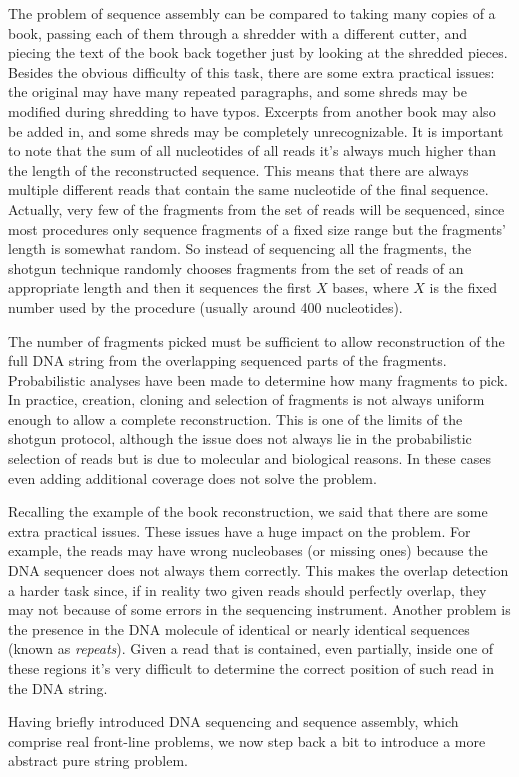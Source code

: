 \documentclass[a4paper,12pt, oneside]{article}
\begin{document}
The problem of sequence assembly can be compared to taking many copies of a book, passing each of them through a shredder with a different cutter, and piecing the text of the book back together just by looking at the shredded pieces. Besides the obvious difficulty of this task, there are some extra practical issues: the original may have many repeated paragraphs, and some shreds may be modified during shredding to have typos. Excerpts from another book may also be added in, and some shreds may be completely unrecognizable. \cite{seqassemblywiki}
It is important to note that the sum of all nucleotides of all reads it's always much higher than the length of the reconstructed sequence. This means that there are always multiple different reads that contain the same nucleotide of the final sequence. Actually, very few of the fragments from the set of reads will be sequenced, since most procedures only sequence fragments of a fixed size range but the fragments' length is somewhat random. So instead of sequencing all the fragments, the shotgun technique randomly chooses fragments from the set of reads of an appropriate length and then it sequences the first $X$ bases, where $X$ is the fixed number used by the procedure (usually around 400 nucleotides). \cite{gusfield} 
\par
The number of fragments picked must be sufficient to allow reconstruction of the full DNA string from the overlapping sequenced parts of the fragments. Probabilistic analyses have been made \cite{mathangen} to determine how many fragments to pick. In practice, creation, cloning and selection of fragments is not always uniform enough to allow a complete reconstruction. This is one of the limits of the shotgun protocol, although the issue does not always lie in the probabilistic selection of reads but is due to molecular and biological reasons. In these cases even adding additional coverage does not solve the problem.
\par
Recalling the example of the book reconstruction, we said that there are some extra practical issues. These issues have a huge impact on the problem. For example, the reads may have wrong nucleobases (or missing ones) because the DNA sequencer does not always  them correctly. This makes the overlap detection a harder task since, if in reality two given reads should perfectly overlap, they may not because of some errors in the sequencing instrument. Another problem is the presence in the DNA molecule of identical or nearly identical sequences (known as \textit{repeats}). Given a read that is contained, even partially, inside one of these regions it's very difficult to determine the correct position of such read in the DNA string.
\par
Having briefly introduced DNA sequencing and sequence assembly, which comprise real front-line problems, we now step back a bit to introduce a more abstract pure string problem.
\end{document}
